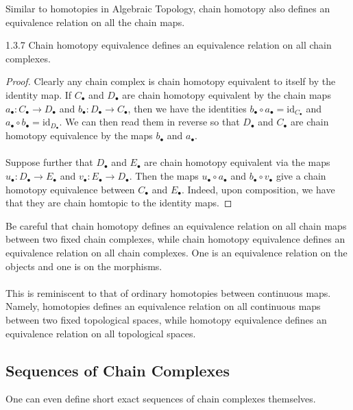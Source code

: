 \documentclass[a4paper]{article}
\begin{document}
Similar to homotopies in Algebraic Topology, chain homotopy also defines an equivalence relation on all the chain maps. 

\begin{prp}{}{1.3.7} Chain homotopy equivalence defines an equivalence relation on all chain complexes. \tcbline
\begin{proof}
Clearly any chain complex is chain homotopy equivalent to itself by the identity map. If $C_\bullet$ and $D_\bullet$ are chain homotopy equivalent by the chain maps $a_\bullet:C_\bullet\to D_\bullet$ and $b_\bullet:D_\bullet\to C_\bullet$, then we have the identities $b_\bullet\circ a_\bullet=\text{id}_{C_\bullet}$ and $a_\bullet\circ b_\bullet=\text{id}_{D_\bullet}$. We can then read them in reverse so that $D_\bullet$ and $C_\bullet$ are chain homotopy equivalence by the maps $b_\bullet$ and $a_\bullet$. \\~\\

Suppose further that $D_\bullet$ and $E_\bullet$ are chain homotopy equivalent via the maps $u_\bullet:D_\bullet\to E_\bullet$ and $v_\bullet:E_\bullet\to D_\bullet$. Then the maps $u_\bullet\circ a_\bullet$ and $b_\bullet\circ v_\bullet$ give a chain homotopy equivalence between $C_\bullet$ and $E_\bullet$. Indeed, upon composition, we have that they are chain  homtopic to the identity maps. 
\end{proof}
\end{prp}

Be careful that chain homotopy defines an equivalence relation on all chain maps between two fixed chain complexes, while chain homotopy equivalence defines an equivalence relation on all chain complexes. One is an equivalence relation on the objects and one is on the morphisms. \\~\\

This is reminiscent to that of ordinary homotopies between continuous maps. Namely, homotopies defines an equivalence relation on all continuous maps between two fixed topological spaces, while homotopy equivalence defines an equivalence relation on all topological spaces. 

\subsection{Sequences of Chain Complexes}
One can even define short exact sequences of chain complexes themselves. 
\end{document}

